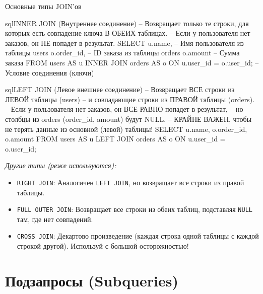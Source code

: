 \begin{textbox}{Основные типы JOIN'ов}
    \begin{codebox}{sql}{INNER JOIN (Внутреннее соединение)}
    -- Возвращает только те строки, для которых есть совпадение ключа В ОБЕИХ таблицах.
    -- Если у пользователя нет заказов, он НЕ попадет в результат.
    SELECT
        u.name, -- Имя пользователя из таблицы users
        o.order_id, -- ID заказа из таблицы orders
        o.amount -- Сумма заказа
    FROM
        users AS u
    INNER JOIN
        orders AS o ON u.user_id = o.user_id; -- Условие соединения (ключи)
    \end{codebox}

    \begin{codebox}{sql}{LEFT JOIN (Левое внешнее соединение)}
    -- Возвращает ВСЕ строки из ЛЕВОЙ таблицы (users)
    -- и совпадающие строки из ПРАВОЙ таблицы (orders).
    -- Если у пользователя нет заказов, он ВСЕ РАВНО попадет в результат,
    -- но столбцы из orders (order_id, amount) будут NULL.
    -- КРАЙНЕ ВАЖЕН, чтобы не терять данные из основной (левой) таблицы!
    SELECT
        u.name,
        o.order_id,
        o.amount
    FROM
        users AS u
    LEFT JOIN
        orders AS o ON u.user_id = o.user_id;
    \end{codebox}

    \textit{Другие типы (реже используются):}
    \begin{itemize}
        \item \texttt{RIGHT JOIN}: Аналогичен \texttt{LEFT JOIN}, но возвращает все строки из правой таблицы.
        \item \texttt{FULL OUTER JOIN}: Возвращает все строки из обеих таблиц, подставляя \texttt{NULL} там, где нет совпадений.
        \item \texttt{CROSS JOIN}: Декартово произведение (каждая строка одной таблицы с каждой строкой другой). Используй с большой осторожностью!
    \end{itemize}
\end{textbox}

\section{Подзапросы (Subqueries)}


